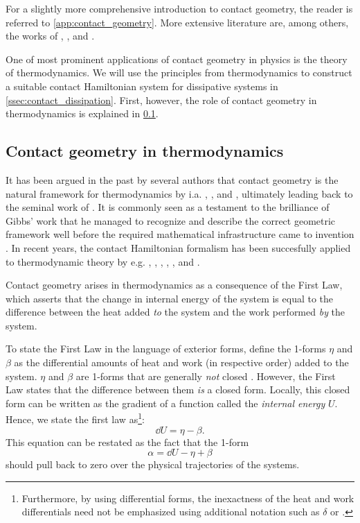 For a slightly more comprehensive introduction to contact geometry, the reader is referred to \cref{app:contact_geometry}. More extensive literature are, among others, the works of \citet{Geiges2008}, \citet{Libermann1987}, \citet{Arnold1989,Arnold1989a} and \citet{Godbillon1969}.

One of most prominent applications of contact geometry in physics is the theory of thermodynamics. We will use the principles from thermodynamics to construct a suitable contact Hamiltonian system for dissipative systems in \cref{ssec:contact_dissipation}. First, however, the role of contact geometry in thermodynamics is explained in \cref{ssec:contact_thermodynamics}.

\subsection{Contact geometry in thermodynamics}
\label{ssec:contact_thermodynamics}
It has been argued in the past by several authors that contact geometry is the natural framework for thermodynamics by i.a. \citet{Arnold1991,Arnold1989a,Arnold1989,Arnold1989b}, \citet{Bamberg1988}, \citet{Burke1985} and \citet{Hermann1973}, ultimately leading back to the seminal work of \citet{Gibbs1873}. It is commonly seen as a testament to the brilliance of Gibbs' work that he managed to recognize and describe the correct geometric framework well before the required mathematical infrastructure came to invention \cite{Wightman1979}. In recent years, the contact Hamiltonian formalism has been succesfully applied to thermodynamic theory by e.g. \citet{Mrugala1991,Mrugala2000,Mrugala1984,Mrugala1985,Mrugala1993,Mrugala1996}, \citet{Balian2001}, \citet{VanderSchaft2021a,VanderSchaft2018}, \citet{Maschke2018}, \citet{Bravetti2015}, and \citet{Simoes2020}. 

Contact geometry arises in thermodynamics as a consequence of the First Law, which asserts that the change in internal energy of the system is equal to the difference between the heat added \emph{to} the system and the work performed \emph{by} the system. 

To state the First Law in the language of exterior forms, define the 1-forms $\eta$ and $\beta$ as the differential amounts of heat and work (in respective order) added to the system. $\eta$ and $\beta$ are 1-forms that are generally \emph{not} closed \cite{Bamberg1988,Frankel2012}. However, the First Law states that the difference between them \emph{is} a closed form. Locally, this closed form  can be written as the gradient of a function called the \emph{internal energy} $U$. Hence, we state the first law as\footnote{Furthermore, by using differential forms, the inexactness of the heat and work differentials need not be emphasized using additional notation such as $\delta$ or \dj.}:
\begin{equation}
    \dd{U} = \eta - \beta.
    \label{eq:thermo_first_law}
\end{equation}
This equation can be restated as the fact that the 1-form
$$ \alpha = \dd{U} - \eta + \beta $$
should pull back to zero over the physical trajectories of the systems.


